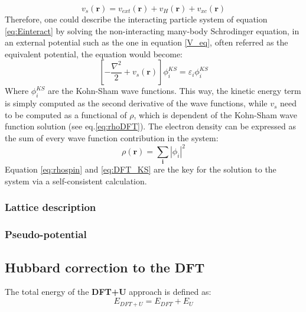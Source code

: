 \begin{equation}
v_s(\mathbf{r}) = v_{ext}(\mathbf{r})+v_{H}(\mathbf{r})+v_{xc}(\mathbf{r})
\label{V_eq}
\end{equation}
Therefore, one could describe the interacting particle system of equation \ref{eq:Einteract} by solving the non-interacting many-body Schrodinger equation, in an external potential such as the one in equation \ref{V_eq}, often referred as the equivalent potential, the equation would become:
\begin{equation}
\left [
- \frac{\nabla^2}{2}+ v_s(\mathbf{r})
\right]
\phi_i^{KS}
=
\varepsilon_i
\phi_i^{KS}
\label{eq:DFT_KS}
\end{equation}
Where $\phi_i^{KS}$ are the Kohn-Sham wave functions. This way, the kinetic energy term is simply computed as the second derivative of the wave functions, while $v_s$ need to be computed as a functional of $\rho$, which is dependent of the Kohn-Sham wave function solution (see eq.\ref{eq:rhoDFT}). The electron density can be expressed as the sum of every wave function contribution in the system:
\begin{equation}
\rho(\mathbf{r}) = \sum_\mathbf{i}
\left| \phi_i \right|^2
\label{eq:rhospin}
\end{equation}
Equation \ref{eq:rhospin} and \ref{eq:DFT_KS} are the key for the solution to the system via a self-consistent calculation.

\subsubsection{Lattice description}

\subsubsection{Pseudo-potential}

\subsection{Hubbard correction to the DFT}
The total energy of the \textbf{DFT+U} approach is defined as:
\begin{equation}
E_{DFT+U} = E_{DFT}+E_{U}
\label{eq:E_dft+U}
\end{equation}

